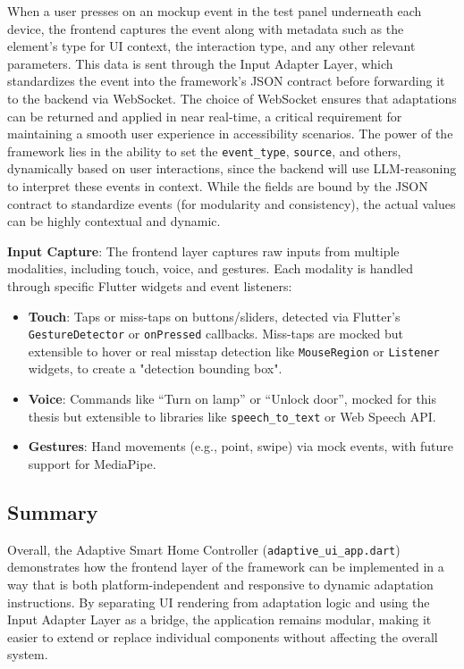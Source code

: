When a user presses on an mockup event in the test panel underneath each device, the frontend captures the event along with metadata such as the element’s type for UI context, the interaction type, and any other relevant parameters. This data is sent through the Input Adapter Layer, which standardizes the event into the framework’s JSON contract before forwarding it to the backend via WebSocket. The choice of WebSocket ensures that adaptations can be returned and applied in near real-time, a critical requirement for maintaining a smooth user experience in accessibility scenarios. The power of the framework lies in the ability to set the \texttt{event\_type}, \texttt{source}, and others, dynamically based on user interactions, since the backend will use LLM-reasoning to interpret these events in context. While the fields are bound by the JSON contract to standardize events (for modularity and consistency), the actual values can be highly contextual and dynamic.

\textbf{Input Capture}: The frontend layer captures raw inputs from multiple modalities, including touch, voice, and gestures. Each modality is handled through specific Flutter widgets and event listeners:
\begin{itemize}
    \item \textbf{Touch}: Taps or miss-taps on buttons/sliders, detected via Flutter’s \verb|GestureDetector| or \verb|onPressed| callbacks. Miss-taps are mocked but extensible to hover or real misstap detection like \verb|MouseRegion| or \verb|Listener| widgets, to create a "detection bounding box".
    \item \textbf{Voice}: Commands like “Turn on lamp” or “Unlock door”, mocked for this thesis but extensible to libraries like \verb|speech_to_text| or Web Speech API.
    \item \textbf{Gestures}: Hand movements (e.g., point, swipe) via mock events, with future support for MediaPipe.
\end{itemize}

\subsection{Summary}
Overall, the Adaptive Smart Home Controller (\texttt{adaptive\_ui\_app.dart}) demonstrates how the frontend layer of the framework can be implemented in a way that is both platform-independent and responsive to dynamic adaptation instructions. By separating UI rendering from adaptation logic and using the Input Adapter Layer as a bridge, the application remains modular, making it easier to extend or replace individual components without affecting the overall system.

